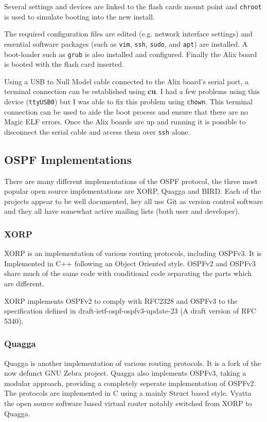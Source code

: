\documentclass[12pt]{report}
\begin{document}
Several settings and devices are linked to the flash cards mount point and
\texttt{chroot} is used to simulate booting into the new install.

The required configuration files are edited (e.g. network interface settings)
and essential software packages (such as \texttt{vim}, \texttt{ssh},
\texttt{sudo}, and \texttt{apt}) are installed. A boot-loader such as
\texttt{grub} is also installed and configured.  Finally the Alix board is
booted with the flash card inserted.  

Using a USB to Null Model cable connected to the Alix board's serial port, a
terminal connection can be established using {\bf cu}. I had a few problems
using this device (\texttt{ttyUSB0}) but I was able to fix this problem using
\texttt{chown}. This terminal connection can be used to aide the boot process and ensure that
there are no Magic ELF errors. Once the Alix boards are up and running it is possible to
disconnect the serial cable and access them over \texttt{ssh} alone. 

\subsection{OSPF Implementations}
There are many different implementations of the OSPF protocol, the three most popular open
source implementations are XORP, Quagga and BIRD. Each of the projects appear to 
be well documented, hey all use Git as version control software and they all 
have somewhat active mailing lists (both user and developer).

\subsubsection{XORP}
XORP is an implementation of various routing protocols, including
OSPFv3. It is Implemented in C++ following an Object Oriented style.
OSPFv2 and OSPFv3 share much of the same code with conditional code
separating the parts which are different.

XORP implements OSPFv2 to comply with RFC2328 and OSPFv3 to the specification
defined in draft-ietf-ospf-ospfv3-update-23 (A draft version of RFC 5340).

\subsubsection{Quagga}
Quagga is another implementation of various routing protocols.  It is a
fork of the now defunct GNU Zebra project.  Quagga also implements
OSPFv3, taking a modular approach, providing a
completely seperate implementation of OSPFv2. The protocols are
implemented in C using a mainly Struct based style.  Vyatta the open
source software based virtual router notably switched from XORP to
Quagga. 
\end{document}
